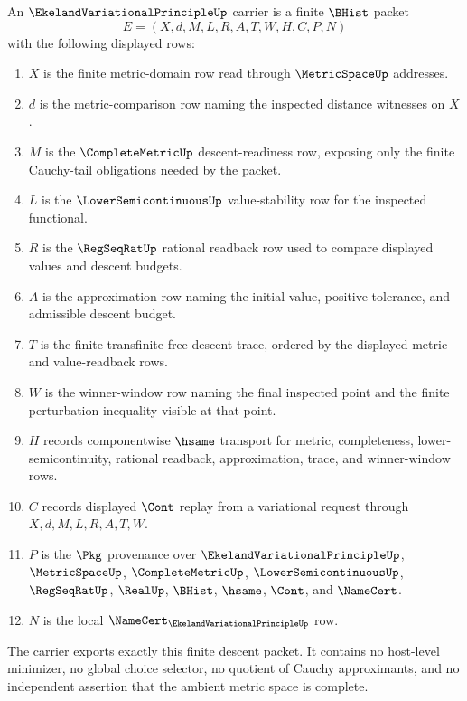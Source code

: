 \begin{definition}
\label{def:ekeland-variational-principle-carrier}
An $\EkelandVariationalPrincipleUp$ carrier is a finite $\BHist$ packet
$$
E=(X,d,M,L,R,A,T,W,H,C,P,N)
$$
with the following displayed rows:
\begin{enumerate}
\item $X$ is the finite metric-domain row read through $\MetricSpaceUp$ addresses.
\item $d$ is the metric-comparison row naming the inspected distance witnesses on $X$.
\item $M$ is the $\CompleteMetricUp$ descent-readiness row, exposing only the finite Cauchy-tail obligations needed by the packet.
\item $L$ is the $\LowerSemicontinuousUp$ value-stability row for the inspected functional.
\item $R$ is the $\RegSeqRatUp$ rational readback row used to compare displayed values and descent budgets.
\item $A$ is the approximation row naming the initial value, positive tolerance, and admissible descent budget.
\item $T$ is the finite transfinite-free descent trace, ordered by the displayed metric and value-readback rows.
\item $W$ is the winner-window row naming the final inspected point and the finite perturbation inequality visible at that point.
\item $H$ records componentwise $\hsame$ transport for metric, completeness, lower-semicontinuity, rational readback, approximation, trace, and winner-window rows.
\item $C$ records displayed $\Cont$ replay from a variational request through $X,d,M,L,R,A,T,W$.
\item $P$ is the $\Pkg$ provenance over $\EkelandVariationalPrincipleUp$, $\MetricSpaceUp$, $\CompleteMetricUp$, $\LowerSemicontinuousUp$, $\RegSeqRatUp$, $\RealUp$, $\BHist$, $\hsame$, $\Cont$, and $\NameCert$.
\item $N$ is the local $\NameCert_{\EkelandVariationalPrincipleUp}$ row.
\end{enumerate}
The carrier exports exactly this finite descent packet. It contains no host-level minimizer, no global choice selector, no quotient of Cauchy approximants, and no independent assertion that the ambient metric space is complete.
\end{definition}

